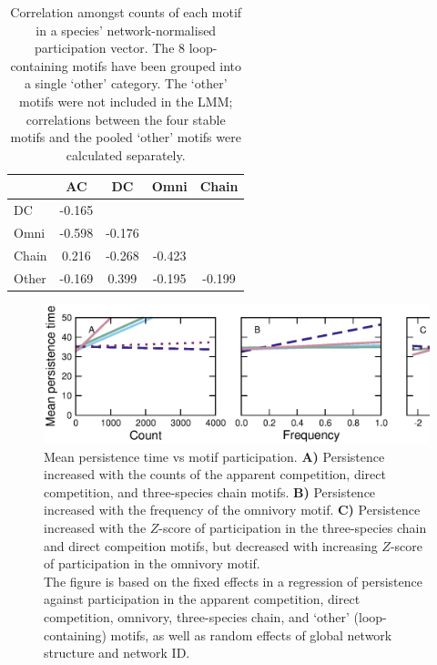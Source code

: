 \documentclass[12pt]{article}
\begin{document}
\begin{spacing}{2.0}
		\begin{table}[h!]
		\caption{Correlation amongst counts of each motif in a species' network-normalised participation vector. The 8 loop-containing motifs have been grouped into a single `other' category. The `other' motifs were not included in the LMM; correlations between the four stable motifs and the pooled `other' motifs were calculated separately.}
		\label{tab:Z_correlations}
		\begin{tabular}{l | c c c c}
			& AC & DC & Omni & Chain \\
		\hline
		DC     & -0.165 &        &        &    \\
		Omni   & -0.598 & -0.176 &        &     \\
		Chain  &  0.216 & -0.268 & -0.423 &      \\
		Other  & -0.169 &  0.399 & -0.195 & -0.199 \\
		\hline
		\end{tabular}
		\end{table}

    \begin{figure}[h!]
        \centering
        \includegraphics[width=\textwidth]{figures/roles/persistence_vs_motifs.eps}
        \caption{Mean persistence time vs motif participation. \textbf{A)} Persistence increased with the counts of the apparent competition, direct competition, and three-species chain motifs. \textbf{B)} Persistence increased with the frequency of the omnivory motif. \textbf{C)} Persistence increased with the $Z$-score of participation in the three-species chain and direct compeition motifs, but decreased with increasing $Z$-score of participation in the omnivory motif. \\The figure is based on the fixed effects in a regression of persistence against participation in the apparent competition, direct competition, omnivory, three-species chain, and `other' (loop-containing) motifs, as well as random effects of global network structure and network ID.}
        \label{fig:persistence_motifs}
    \end{figure}


\end{spacing}
\end{document}
